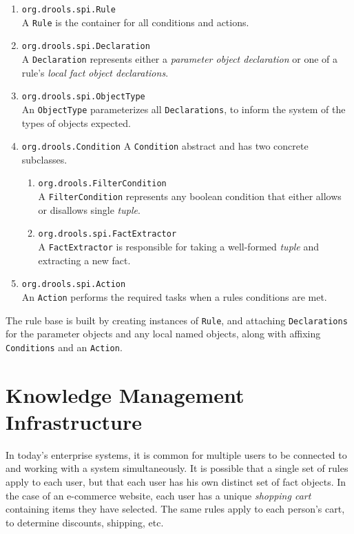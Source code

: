 \documentclass[10pt,letterpaper]{article}
\begin{document}
\begin{enumerate}
	\item \verb|org.drools.spi.Rule|\\
		A \verb|Rule| is the container for all conditions and
		actions.
	\item \verb|org.drools.spi.Declaration|\\
		A \verb|Declaration| represents either a
		\emph{parameter object declaration} or one of a
		rule's \emph{local fact object declarations}.
	\item \verb|org.drools.spi.ObjectType|\\
		An \verb|ObjectType| parameterizes all \verb|Declarations|,
		to inform the system of the types of objects expected.
	\item \verb|org.drools.Condition|
		A \verb|Condition| abstract and has two concrete
		subclasses.
		\begin{enumerate}
			\item \verb|org.drools.FilterCondition|\\
			A \verb|FilterCondition| represents any boolean
			condition that either allows or disallows single
			\emph{tuple}.
			\item \verb|org.drools.spi.FactExtractor|\\
			A \verb|FactExtractor| is responsible
			for taking a well-formed \emph{tuple} and 
			extracting a new fact.
		\end{enumerate}
	\item \verb|org.drools.spi.Action|\\
		An \verb|Action| performs the required tasks when 
		a rules conditions are met.
\end{enumerate}

The rule base is built by creating instances of \verb|Rule|, 
and attaching \verb|Declarations| for the parameter objects and any
local named objects, along with affixing \verb|Conditions|
and an \verb|Action|.

\section{Knowledge Management Infrastructure}

In today's enterprise systems, it is common for multiple users to
be connected to and working with a system simultaneously.  It is
possible that a single set of rules apply to each user, but that
each user has his own distinct set of fact objects.  In the case
of an e-commerce website, each user has a unique \emph{shopping cart}
containing items they have selected.  The same rules apply to 
each person's cart, to determine discounts, shipping, etc.
\end{document}
